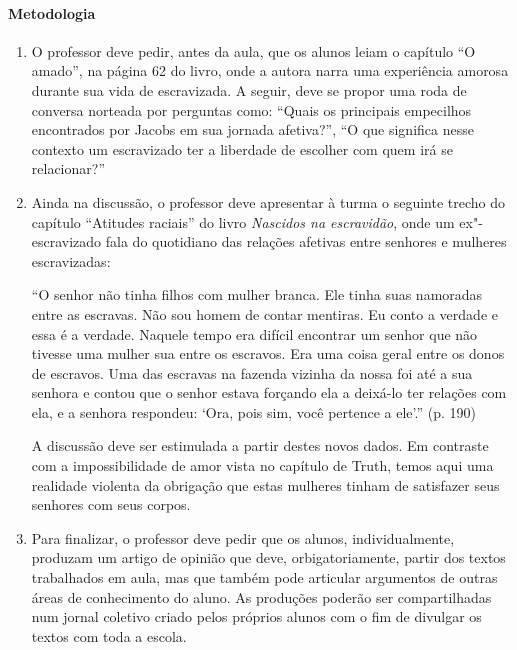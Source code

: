\documentclass[11pt]{extarticle}
\begin{document}
 \paragraph{Metodologia}
   \begin{enumerate}
    \item
    O professor deve pedir, antes da aula, que os alunos leiam o capítulo ``O amado'', 
    na página 62 do livro, onde a autora narra uma experiência amorosa durante 
    sua vida de escravizada.
    A seguir, deve se propor uma roda de conversa norteada por perguntas como:
    ``Quais os principais empecilhos encontrados por Jacobs em sua jornada afetiva?'',
    ``O que significa nesse contexto um escravizado ter a liberdade de escolher
    com quem irá se relacionar?''
   
   \item 
   Ainda na discussão, o professor deve apresentar à turma o seguinte trecho do capítulo
   ``Atitudes raciais'' do livro \emph{Nascidos na escravidão}, onde um ex"-escravizado 
   fala do quotidiano das relações afetivas entre senhores e mulheres escravizadas:

   ``O senhor não tinha filhos com mulher branca. Ele tinha
suas namoradas entre as escravas. Não sou homem de
contar mentiras. Eu conto a verdade e essa é a verdade.
Naquele tempo era difícil encontrar um senhor que não
tivesse uma mulher sua entre os escravos. Era uma coisa
geral entre os donos de escravos.
Uma das escravas na fazenda vizinha da nossa foi até
a sua senhora e contou que o senhor estava forçando ela a
deixá-lo ter relações com ela, e a senhora respondeu: ‘Ora,
pois sim, você pertence a ele’.'' (p. 190)

    A discussão deve ser estimulada a partir destes novos dados. Em contraste com a 
    impossibilidade de amor vista no capítulo de Truth, temos aqui uma realidade
    violenta da obrigação que estas mulheres tinham de satisfazer seus senhores com seus
    corpos.  

    \item
    Para finalizar, o professor deve pedir que os alunos, individualmente,
    produzam um artigo de opinião que deve, orbigatoriamente, partir
    dos textos trabalhados em aula, mas que também pode articular argumentos
    de outras áreas de conhecimento do aluno. As produções poderão ser
    compartilhadas num jornal coletivo criado pelos próprios alunos com
    o fim de divulgar os textos com toda a escola.

   \end{enumerate}
\end{document}
